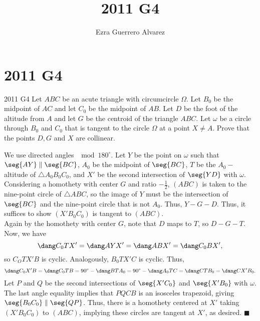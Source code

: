 \documentclass[14pt]{article}
\title{2011 G4}
\author{Ezra Guerrero Alvarez}
\begin{document}
\maketitle
	
\section*{2011 G4}

\begin{statement}{2011 G4}
	Let $ABC$ be an acute triangle with circumcircle $\Omega$. Let $B_0$ be the midpoint of $AC$ and let $C_0$ be the midpoint of $AB$. Let $D$ be the foot of the altitude from $A$ and let $G$ be the centroid of the triangle $ABC$. Let $\omega$ be a circle through $B_0$ and $C_0$ that is tangent to the circle $\Omega$ at a point $X\not= A$. Prove that the points $D,G$ and $X$ are collinear.
\end{statement}
We use directed angles $\mod180^\circ$. Let $Y$ be the point on $\omega$ such that $\seg{AY}\parallel\seg{BC}$, $A_0$ be the midpoint of $\seg{BC}$, $T$ be the $A_0-$altitude of $\triangle A_0B_0C_0$, and $X'$ be the second intersection of $\seg{YD}$ with $\omega$. Considering a homothety with center $G$ and ratio $-\frac12$, $(ABC)$ is taken to the nine-point circle of $\triangle ABC$, so the image of $Y$ must be the intersection of $\seg{BC}$ and the nine-point circle that is not $A_0$. Thus, $Y-G-D$. Thus, it suffices to show $(X'B_0C_0)$ is tangent to $(ABC)$. \\
Again by the homothety with center $G$, note that $D$ maps to $T$, so $D-G-T$. Now, we have
\[ \dang C_0TX'= \dang AYX' = \dang ABX' = \dang C_0BX', \]
so $C_OTX'B$ is cyclic. Analogously, $B_0TX'C$ is cyclic. Thus, 
\[ \dang C_0X'B=\dang C_0TB = 90^\circ-\dang BTA_0 = 90^\circ-\dang A_0TC = \dang CTB_0 = \dang CX'B_0. \]
Let $P$ and $Q$ be the second intersections of $\seg{X'C_0}$ and $\seg{X'B_0}$ with $\omega$. The last angle equality implies that $PQCB$ is an isosceles trapezoid, giving $\seg{B_0C_0}\parallel\seg{QP}$. Thus, there is a homothety centered at $X'$ taking $(X'B_0C_0)$ to $(ABC)$, implying these circles are tangent at $X'$, as desired. $\blacksquare$
	
\end{document}
